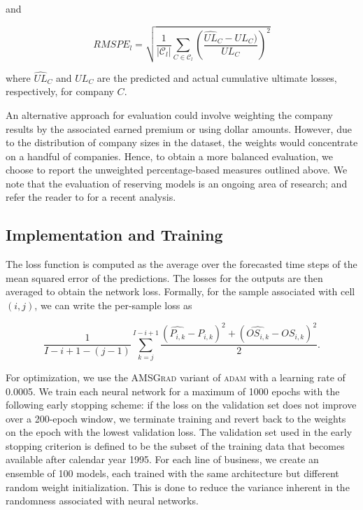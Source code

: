 \documentclass[risks,article,submit,moreauthors,pdftex]{mdpi}
\begin{document}
and

\begin{equation}
RMSPE_l = \sqrt{\frac{1}{|\mathcal{C}_l|}\sum_{C\in\mathcal{C}_l}\left(\frac{\widehat{UL}_C - UL_C)}{UL_C}\right)^2}
\end{equation}

where \(\widehat{UL}_C\) and \(UL_C\) are the predicted and actual cumulative ultimate losses, respectively, for company \(C\).

An alternative approach for evaluation could involve weighting the company results by the associated earned premium or using dollar amounts. However, due to the distribution of company sizes in the dataset, the weights would concentrate on a handful of companies. Hence, to obtain a more balanced evaluation, we choose to report the unweighted percentage-based measures outlined above. We note that the evaluation of reserving models is an ongoing area of research; and refer the reader to \citet{martinek2019analysis} for a recent analysis.

\hypertarget{implementation-and-training}{%
\subsection{Implementation and Training}\label{implementation-and-training}}

The loss function is computed as the average over the forecasted time steps of the mean squared error of the predictions. The losses for the outputs are then averaged to obtain the network loss. Formally, for the sample associated with cell \((i, j)\), we can write the per-sample loss as

\begin{equation}
\frac{1}{I-i+1-(j-1)}\sum_{k = j}^{I-i+1}\frac{(\widehat{P_{i,k}} - P_{i,k})^2 + (\widehat{OS_{i,k}} - OS_{i,k})^2}{2}.
\end{equation}

For optimization, we use the \textsc{AMSGrad} \citep{j.2018on} variant of \textsc{adam} with a learning rate of 0.0005. We train each neural network for a maximum of 1000 epochs with the following early stopping scheme: if the loss on the validation set does not improve over a 200-epoch window, we terminate training and revert back to the weights on the epoch with the lowest validation loss. The validation set used in the early stopping criterion is defined to be the subset of the training data that becomes available after calendar year 1995. For each line of business, we create an ensemble of 100 models, each trained with the same architecture but different random weight initialization. This is done to reduce the variance inherent in the randomness associated with neural networks.
\end{document}
